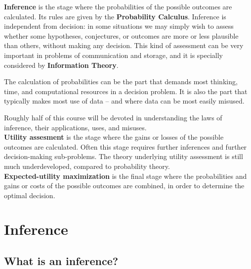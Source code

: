 \documentclass[
  a4paper,
  DIV=11,
  numbers=noendperiod,
  oneside]{scrreprt}
\begin{document}
{ \textbf{Inference}} is the stage where the probabilities
of the possible outcomes are calculated. Its rules are given by the
{\textbf{Probability Calculus}}. Inference is independent from decision:
in some situations we may simply wish to assess whether some hypotheses,
conjectures, or outcomes are more or less plausible than others, without
making any decision. This kind of assessment can be very important in
problems of communication and storage, and it is specially considered by
{\textbf{Information Theory}}.

The calculation of probabilities can be the part that demands most
thinking, time, and computational resources in a decision problem. It is
also the part that typically makes most use of data -- and where data
can be most easily misused.

Roughly half of this course will be devoted in understanding the laws of
inference, their applications, uses, and misuses.\\

{ \textbf{Utility assesment}} is the stage where the gains
or losses of the possible outcomes are calculated. Often this stage
requires further inferences and further decision-making sub-problems.
The theory underlying utility assessment is still much underdeveloped,
compared to probability theory.\\

{ \textbf{Expected-utility maximization}} is the final
stage where the probabilities and gains or costs of the possible
outcomes are combined, in order to determine the optimal decision.

\part{Inference}

\hypertarget{what-is-an-inference}{%
\chapter{What is an inference?}\label{what-is-an-inference}}

\providecommand{\ul}{\uline}
\renewcommand*{\|}[1][]{\nonscript\:#1\vert\nonscript\:\mathopen{}}
\providecommand*{\pr}[1]{\textsf{\small`#1'}}
\renewcommand*{\pr}[1]{\textsf{\small`#1'}}
\providecommand*{\prq}[1]{\textsf{\small #1}}
\renewcommand*{\prq}[1]{\textsf{\small #1}}
\providecommand{\se}[1]{\mathsfit{#1}}
\renewcommand{\se}[1]{\mathsfit{#1}}
\providecommand{\p}{\mathrm{p}}
\renewcommand{\p}{\mathrm{p}}
\renewcommand{\P}{\mathrm{P}}
\end{document}
